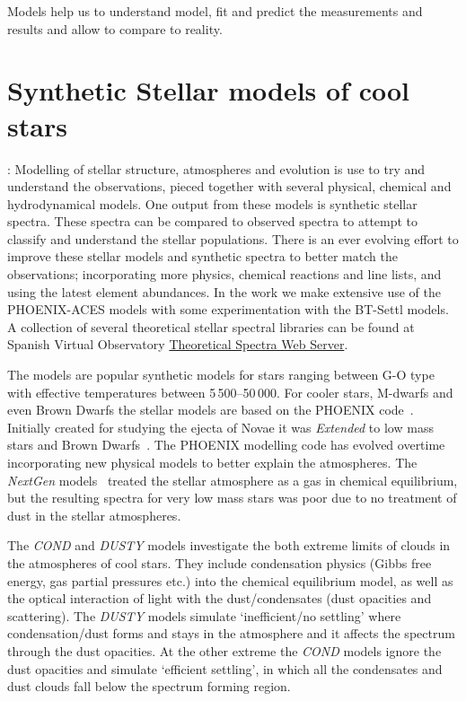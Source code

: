 
Models help us to understand model, fit and predict the measurements and results and allow to compare to reality.

\section{Synthetic Stellar models of cool stars}:
Modelling of stellar structure, atmospheres and evolution is use to try and understand the observations, pieced together with several physical, chemical and hydrodynamical models.
One output from these models is synthetic stellar spectra.
These spectra can be compared to observed spectra to attempt to classify and understand the stellar populations.
There is an ever evolving effort to improve these stellar models and synthetic spectra to better match the observations; incorporating more physics, chemical reactions and line lists, and using the latest element abundances.
In the work we make extensive use of the {PHOENIX-ACES} models with some experimentation with the {BT-Settl} models.
A collection of several theoretical stellar spectral libraries can be found at Spanish Virtual Observatory \href{http://svo2.cab.inta-csic.es/theory/newov/index.php}{Theoretical Spectra Web Server}.

The \citet{kurucz_model_1979} models are popular synthetic models for stars ranging between G-O type with effective temperatures between 5\,500--50\,000\K.
For cooler stars, M-dwarfs and even Brown Dwarfs the stellar models are based on the {PHOENIX} code~\citep[e.g.][]{hauschildt_parallel_1997}.
Initially created for studying the ejecta of Novae it was \emph{Extended} to low mass stars and Brown Dwarfs~\citep{allard_model_1995}.
The PHOENIX modelling code has evolved overtime incorporating new physical models to better explain the atmospheres.
The \emph{NextGen} models~\citep{hauschildt_nextgen_1999b} treated the stellar atmosphere as a gas in chemical equilibrium, but the resulting spectra for very low mass stars was poor due to no treatment of dust in the stellar atmospheres.

The \citep{allard_limiting_2001} \emph{COND} and \emph{DUSTY} models investigate the both extreme limits of clouds in the atmospheres of cool stars.
They include condensation physics (Gibbs free energy, gas partial pressures etc.) into the chemical equilibrium model, as well as the optical interaction of light with the dust/condensates (dust opacities and scattering).
The \emph{DUSTY} models simulate `inefficient/no settling' where condensation/dust forms and stays in the atmosphere and it affects the spectrum through the dust opacities.
At the other extreme the \emph{COND} models ignore the dust opacities and simulate `efficient settling', in which all the condensates and dust clouds fall below the spectrum forming region.

